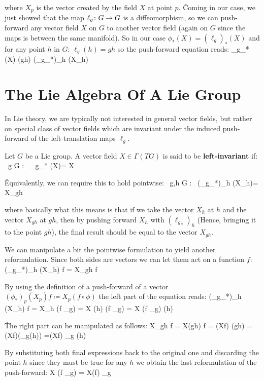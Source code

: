 where $X_p$ is the vector created by the field $X$ at point $p$. \v

Coming in our case, we just showed that the map $\ell_g\colon G\to G$ is a diffeomorphism, so we can push-forward any
vector field $X$ on $G$ to another vector field (again on $G$ since the maps is between the same manifold). So in our
case $\phi_* (X) = (\ell_g)_* (X)$ and for any point $h$ in $G$: $\ell_g (h) = gh$ so the push-forward equation reads:
\bse
{\ell_{g}}_{*} (X) (gh) \coloneqq ({\ell_{g}}_{*})_{h} (X_h)
\ese

\section{The Lie Algebra Of A Lie Group}

In Lie theory, we are typically not interested in general vector fields, but rather on special class of vector fields
which are invariant under the induced push-forward of the left translation maps $\ell_g$.

Let $G$ be a Lie group. A vector field $X\in\Gamma(TG)$ is said to be \textbf{left-invariant} if:
\bse
\forall \, g \in G : \ {\ell_{g}}_{*} (X)= X
\ese

\v

Equivalently, we can require this to hold pointwise:
\bse
\forall \, g,h \in G : \ ({\ell_{g}}_{*})_{h} (X_h)= X_{gh}
\ese

where basically what this means is that if we take the vector $X_h$ at $h$ and the vector $X_{gh}$ at $gh$, then by
pushing forward $X_h$ with $({\ell_{g}}_{*})_{h}$ (Hence, bringing it to the point $gh$), the final result should be
equal to the vector $X_{gh}$.
\ed

We can manipulate a bit the pointwise formulation to yield another reformulation. Since both sides are vectors we can
let them act on a function $f$:
\bse
({\ell_{g}}_{*})_{h} (X_h) f = X_{gh} f
\ese

By using the definition of a push-forward of a vector $(\phi_*)_p (X_p) f \coloneqq X_p(f \circ \phi)$ the left part
of the equation reads:
\bse
({\ell_{g}}_{*})_{h} (X_h) f = X_h (f \circ \ell_g) = X (h) (f \circ \ell_g) = X (f \circ \ell_g) (h)
\ese

\v

The right part can be manipulated as follows:
\bse
X_{gh} f = X(gh) f = (Xf) (gh) = (Xf)(\ell_g(h)) =(Xf) \circ \ell_g (h)
\ese

By substituting both final expressions back to the original one and discarding the point $h$ since they must be true
for any $h$ we obtain the last reformulation of the push-forward:
\bse
X (f \circ \ell_g) = X(f) \circ \ell_g
\ese


